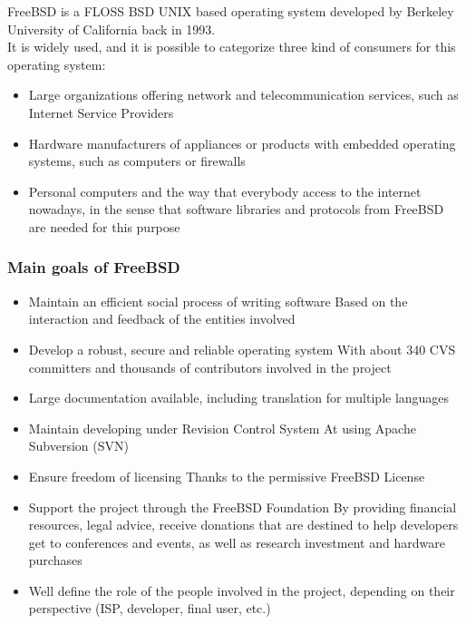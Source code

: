 \documentclass[11pt]{article} %
\begin{document}
FreeBSD is a FLOSS BSD UNIX based operating system developed by Berkeley University of California back in 1993.\\

It is widely used, and it is possible to categorize three kind of consumers for this operating system:

\begin{itemize}
  \item Large organizations offering network and telecommunication services, such as Internet Service Providers
  \item Hardware manufacturers of appliances or products with embedded operating systems, such as computers or firewalls
  \item Personal computers and the way that everybody access to the internet nowadays, in the sense that software libraries and protocols from FreeBSD are needed for this purpose
\end{itemize}


\subsubsection{Main goals of FreeBSD}


\begin{itemize}
  \item Maintain an efficient social process of writing software  
    Based on the interaction and feedback of the entities involved
  
  \item Develop a robust, secure and reliable operating system
    With about 340 CVS committers and thousands of contributors involved in the project
  
  \item Large documentation available, including translation for multiple languages
  
  \item Maintain developing under Revision Control System
	At using Apache Subversion (SVN)   
  
  \item Ensure freedom of licensing
	Thanks to the permissive FreeBSD License  

  \item Support the project through the FreeBSD Foundation
	By providing financial resources, legal advice, receive donations that are destined to help developers get to conferences and events, as well as research investment and hardware purchases
	
  \item Well define the role of the people involved in the project, depending on their perspective (ISP, developer, final user, etc.)
  
\end{itemize}
\end{document}
